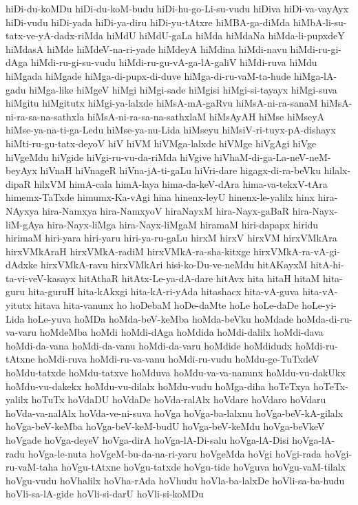 {hiDi-du-koMDu
hiDi-du-koM-budu
hiDi-hu-go-Li-su-vudu
hiDiva
hiDi-va-vayAyx
hiDi-vudu
hiDi-yada
hiDi-ya-diru
hiDi-yu-tAtxre
hiMBA-ga-diMda
hiMbA-li-su-tatx-ve-yA-dadx-riMda
hiMdU
hiMdU-gaLa
hiMda
hiMdaNa
hiMda-li-pupxdeY
hiMdasA
hiMde
hiMdeV-na-ri-yade
hiMdeyA
hiMdina
hiMdi-navu
hiMdi-ru-gi-dAga
hiMdi-ru-gi-su-vudu
hiMdi-ru-gu-vA-ga-lA-galiV
hiMdi-ruva
hiMdu
hiMgada
hiMgade
hiMga-di-pupx-di-duve
hiMga-di-ru-vaM-ta-hude
hiMga-lA-gadu
hiMga-like
hiMgeV
hiMgi
hiMgi-sade
hiMgisi
hiMgi-si-tayayx
hiMgi-suva
hiMgitu
hiMgitutx
hiMgi-ya-lalxde
hiMsA-mA-gaRvu
hiMsA-ni-ra-sanaM
hiMsA-ni-ra-sa-na-sathxla
hiMsA-ni-ra-sa-na-sathxlaM
hiMsAyAH
hiMse
hiMseyA
hiMse-ya-na-ti-ga-Ledu
hiMse-ya-nu-Lida
hiMseyu
hiMsiV-ri-tuyx-pA-dishayx
hiMti-ru-gu-tatx-deyoV
hiV
hiVM
hiVMga-lalxde
hiVMge
hiVgAgi
hiVge
hiVgeMdu
hiVgide
hiVgi-ru-vu-da-riMda
hiVgive
hiVhaM-di-ga-La-neV-neM-beyAyx
hiVnaH
hiVnageR
hiVna-jA-ti-gaLu
hiVri-dare
higagx-di-ra-beVku
hilalx-dipaR
hilxVM
himA-cala
himA-laya
hima-da-keV-dAra
hima-va-tekxV-tAra
himemx-TaTxde
himumx-Ka-vAgi
hina
hinenx-leyU
hinenx-le-yalilx
hinx
hira-NAyxya
hira-Namxya
hira-NamxyoV
hiraNayxM
hira-Nayx-gaBaR
hira-Nayx-liM-gAya
hira-Nayx-liMga
hira-Nayx-liMgaM
hiramaM
hiri-dapapx
hiridu
hirimaM
hiri-yara
hiri-yaru
hiri-ya-ru-gaLu
hirxM
hirxV
hirxVM
hirxVMkAra
hirxVMkAraH
hirxVMkA-radiM
hirxVMkA-ra-sha-kitxge
hirxVMkA-ra-vA-gi-dAdxke
hirxVMkA-ravu
hirxVMkAri
hisi-ko-Du-ve-neMdu
hitAKayxM
hitA-hi-ta-vi-veV-kasayx
hitAthaR
hitAtx-Le-ya-dA-dare
hitAvx
hita
hitaH
hitaM
hita-guru
hita-guruH
hita-kAkxgi
hita-kA-ri-yAda
hitashacx
hita-vA-guva
hita-vA-yitutx
hitava
hita-vanunx
ho
hoDebaM
hoDe-daMte
hoLe
hoLe-daDe
hoLe-yi-Lida
hoLe-yuva
hoMDa
hoMda-beV-keMba
hoMda-beVku
hoMdade
hoMda-di-ru-va-varu
hoMdeMba
hoMdi
hoMdi-dAga
hoMdida
hoMdi-dalilx
hoMdi-dava
hoMdi-da-vana
hoMdi-da-vanu
hoMdi-da-varu
hoMdide
hoMdidudx
hoMdi-ru-tAtxne
hoMdi-ruva
hoMdi-ru-va-vanu
hoMdi-ru-vudu
hoMdu-ge-TuTxdeV
hoMdu-tatxde
hoMdu-tatxve
hoMduva
hoMdu-va-va-nanunx
hoMdu-vu-dakUkx
hoMdu-vu-dakekx
hoMdu-vu-dilalx
hoMdu-vudu
hoMga-diha
hoTeTxya
hoTeTx-yalilx
hoTuTx
hoVdaDU
hoVdaDe
hoVda-ralAlx
hoVdare
hoVdaro
hoVdaru
hoVda-va-nalAlx
hoVda-ve-ni-suva
hoVga
hoVga-ba-lalxnu
hoVga-beV-kA-gilalx
hoVga-beV-keMba
hoVga-beV-keM-budU
hoVga-beV-keMdu
hoVga-beVkeV
hoVgade
hoVga-deyeV
hoVga-dirA
hoVga-lA-Di-salu
hoVga-lA-Disi
hoVga-lA-radu
hoVga-le-nuta
hoVgeM-bu-da-na-ri-yaru
hoVgeMda
hoVgi
hoVgi-rada
hoVgi-ru-vaM-taha
hoVgu-tAtxne
hoVgu-tatxde
hoVgu-tide
hoVguva
hoVgu-vaM-tilalx
hoVgu-vudu
hoVhalilx
hoVha-rAda
hoVhudu
hoVla-ba-lalxDe
hoVli-sa-ba-hudu
hoVli-sa-lA-gide
hoVli-si-darU
hoVli-si-koMDu
}

